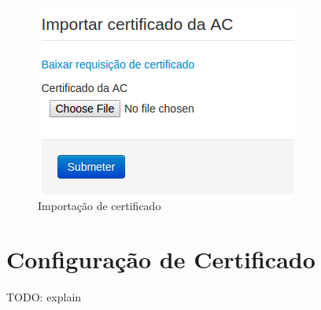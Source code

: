     \begin{figure}[h]
     \centering
     \includegraphics[scale=0.6]{images/importacertAC.png}
     \caption{Importação de certificado}
     \label{fig:reqcert}
\end{figure}



\section{Configuração de Certificado}
TODO: explain
    
